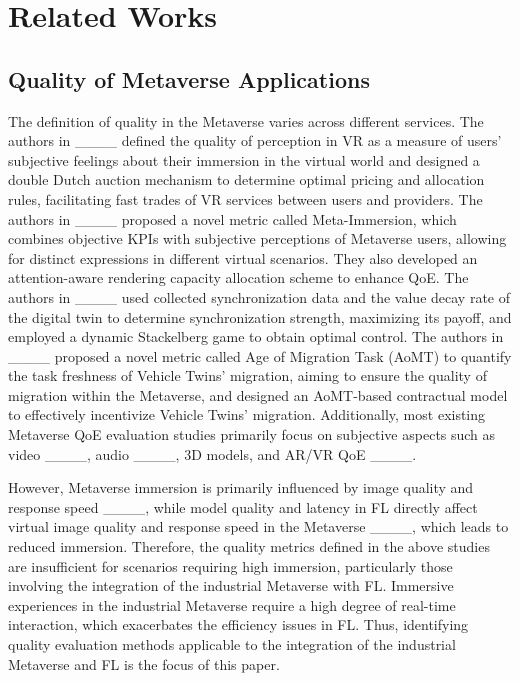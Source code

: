 \section{Related Works}
\subsection{Quality of Metaverse Applications}
The definition of quality in the Metaverse varies across different services. The authors in ____ defined the quality of perception in VR as a measure of users' subjective feelings about their immersion in the virtual world and designed a double Dutch auction mechanism to determine optimal pricing and allocation rules, facilitating fast trades of VR services between users and providers. The authors in ____ proposed a novel metric called Meta-Immersion, which combines objective KPIs with subjective perceptions of Metaverse users, allowing for distinct expressions in different virtual scenarios. They also developed an attention-aware rendering capacity allocation scheme to enhance QoE. The authors in ____ used collected synchronization data and the value decay rate of the digital twin to determine synchronization strength, maximizing its payoff, and employed a dynamic Stackelberg game to obtain optimal control. The authors in ____ proposed a novel metric called Age of Migration Task (AoMT) to quantify the task freshness of Vehicle Twins' migration, aiming to ensure the quality of migration within the Metaverse, and designed an AoMT-based contractual model to effectively incentivize Vehicle Twins' migration. Additionally, most existing Metaverse QoE evaluation studies primarily focus on subjective aspects such as video ____, audio ____, 3D models, and AR/VR QoE ____.

However, Metaverse immersion is primarily influenced by image quality and response speed ____, while model quality and latency in FL directly affect virtual image quality and response speed in the Metaverse ____, which leads to reduced immersion. Therefore, the quality metrics defined in the above studies are insufficient for scenarios requiring high immersion, particularly those involving the integration of the industrial Metaverse with FL. Immersive experiences in the industrial Metaverse require a high degree of real-time interaction, which exacerbates the efficiency issues in FL. Thus, identifying quality evaluation methods applicable to the integration of the industrial Metaverse and FL is the focus of this paper.

